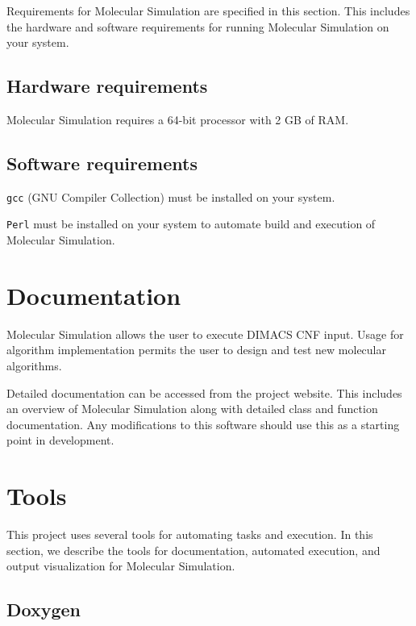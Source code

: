 	Requirements for Molecular Simulation are specified in this section.  This includes the hardware and software requirements for running Molecular Simulation on your system.

	\subsection{Hardware requirements}
	
	\par \noindent Molecular Simulation requires a 64-bit processor with 2 GB of RAM.  
 	
 	\subsection{Software requirements}
	
	\par \noindent \texttt{gcc} (GNU Compiler Collection) must be installed on your system. \\
	
	\par \noindent \texttt{Perl} must be installed on your system to automate build and execution of Molecular Simulation.
	

	\section{Documentation}

Molecular Simulation allows the user to execute DIMACS CNF input.  Usage for algorithm implementation permits the user to design and test new molecular algorithms.

Detailed documentation can be accessed from the project website.  This includes an overview of Molecular Simulation along with detailed class and function documentation.  Any modifications to this software should use this as a starting point in development. 
		
	\section{Tools}
	
This project uses several tools for automating tasks and execution.  In this section, we describe the tools for documentation, automated execution, and output visualization for Molecular Simulation.
		
		\subsection{Doxygen}
		
